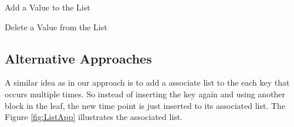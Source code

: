 \documentclass[abstracton,12pt]{scrreprt}
\begin{document}
\begin{algorithm}[ht!]
	
	\caption{Add a Value to the List}
\end{algorithm}

\begin{algorithm}[ht!]
	
	\caption{Delete a Value from the List}
\end{algorithm}

\subsection{Alternative Approaches}

A similar idea as in our approach is to add a associate list to the each key that occurs multiple times. So instead of inserting the key again and using another block in the leaf, the new time point is just inserted to its associated list. The Figure \ref{fig:ListApp} illustrates the associated list.
\end{document}
